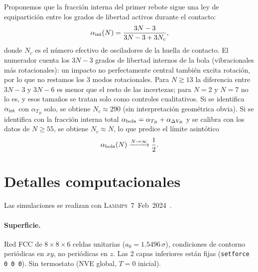 \documentclass[12pt,a4paper]{article}
\newcommand{\lammps}{\textsc{Lammps}}
\begin{document}
Proponemos que la fracción interna del primer rebote sigue una ley de
equipartición entre los grados de libertad activos durante el contacto:
\begin{equation}
    \alpha_{\rm int}(N) = \frac{3N-3}{3N-3+3N_c},
    \label{eq:equiparticion}
\end{equation}
donde $N_c$ es el número efectivo de osciladores de la huella de contacto.
El numerador cuenta los $3N-3$ grados de libertad internos de la bola
(vibracionales más rotacionales): un impacto no perfectamente central también
excita rotación, por lo que no restamos los 3 modos rotacionales. Para
$N\gtrsim13$ la diferencia entre $3N-3$ y $3N-6$ es menor que el resto de
las incertezas; para $N=2$ y $N=7$ no lo es, y esos tamaños se tratan solo
como controles cualitativos.
Si se identifica $\alpha_{\rm int}$ con $\alpha_{T_B}$ solo, se obtiene
$N_c\approx290$ (sin interpretación geométrica obvia). Si se identifica con
la fracción interna total $\alpha_{\rm bola}=\alpha_{T_B}+\alpha_{\Delta V_B}$
y se calibra con los datos de $N\geq55$, se obtiene $N_c\approx N$, lo que
predice el límite asintótico
\begin{equation}
    \alpha_{\rm bola}(N)\xrightarrow{N\to\infty}\frac{1}{2}.
    \label{eq:limite}
\end{equation}

\section{Detalles computacionales}
\label{sec:lammps}

Las simulaciones se realizan con \lammps~7~Feb~2024~\cite{Thompson2022}.

\paragraph{Superficie.}
Red FCC de $8\times8\times6$ celdas unitarias ($a_0=1.5496\,\sigma$),
condiciones de contorno periódicas en $xy$, no periódicas en $z$.
Las 2 capas inferiores están fijas (\texttt{setforce 0 0 0}).
Sin termostato (NVE global, $T=0$ inicial).
\end{document}
